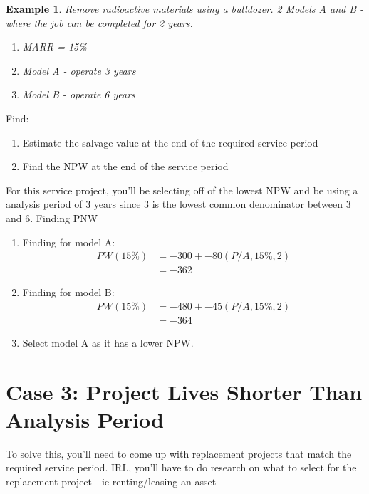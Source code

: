 \documentclass{report} %
\newtheorem{exmp}{Example}
\begin{document}
\begin{exmp}
    Remove radioactive materials using a bulldozer. 2 Models A and B - where the job can be completed for 2 years.
    \begin{enumerate}
        \item MARR = 15\%
        \item Model A - operate 3 years
        \item Model B - operate 6 years
    \end{enumerate}
\end{exmp}
Find:
\begin{enumerate}
    \item Estimate the salvage value at the end of the required service period
    \item Find the NPW at the end of the service period
\end{enumerate}
For this service project, you'll be selecting off of the lowest NPW and be using a analysis period of 3 years since 3 is the lowest common denominator between 3 and 6.
Finding PNW
\begin{enumerate}
    \item Finding for model A:
        \begin{equation*}
            \begin{aligned}
                PW(15\%) &= -300 + -80(P/A,15\%,2) \\
                    &= -362
            \end{aligned}
        \end{equation*}
    \item Finding for model B:
        \begin{equation*}
            \begin{aligned}
                PW(15\%) &= -480 + -45(P/A,15\%,2) \\
                &= -364
            \end{aligned}
        \end{equation*}
    \item Select model A as it has a lower NPW.
\end{enumerate}

\section*{Case 3: Project Lives Shorter Than Analysis Period}
To solve this, you'll need to come up with replacement projects that match the required service period. IRL, you'll have to do research on what to select for the replacement project - ie renting/leasing an asset
\end{document}
